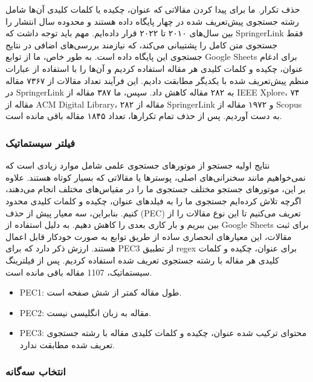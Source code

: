 \documentclass[a4paper,10pt]{article}
\begin{document}
                حذف تکرار. ما برای پیدا کردن مقالاتی که عنوان، چکیده یا کلمات کلیدی آن‌ها شامل رشته جستجوی پیش‌تعریف شده در چهار پایگاه داده هستند و محدوده سال انتشار را بین سال‌های ۲۰۱۰ تا ۲۰۲۲ قرار داده‌ایم. مهم باید توجه داشت که SpringerLink فقط جستجوی متن کامل را پشتیبانی می‌کند، که نیازمند بررسی‌های اضافی در نتایج جستجوی این پایگاه داده است. به طور خاص، ما از توابع Google Sheets برای ادغام عنوان، چکیده و کلمات کلیدی هر مقاله استفاده کردیم و آن‌ها را با استفاده از عبارات منظم پیش‌تعریف شده با یکدیگر مطابقت دادیم. این فرآیند تعداد مقالات از ۷۳۶۷ مقاله در SpringerLink به ۲۸۲ مقاله کاهش داد. سپس، ما ۳۸۷ مقاله از IEEE Xplore، ۷۴ مقاله از ACM Digital Library، ۲۸۲ مقاله از SpringerLink و ۱۹۷۲ مقاله از Scopus به دست آوردیم. پس از حذف تمام تکرارها، تعداد ۱۸۴۵ مقاله باقی مانده است.
            
            \subsubsection{فیلتر سیستماتیک}

                نتایج اولیه جستجو از موتورهای جستجوی علمی شامل موارد زیادی است که نمی‌خواهیم مانند سخنرانی‌های اصلی، پوسترها یا مقالاتی که بسیار کوتاه هستند. علاوه بر این، موتورهای جستجو مختلف جستجوی ما را در مقیاس‌های مختلف انجام می‌دهند، اگرچه تلاش کرده‌ایم جستجوی ما را به فیلدهای عنوان، چکیده و کلمات کلیدی محدود کنیم. بنابراین، سه معیار پیش از حذف (PEC) تعریف می‌کنیم تا این نوع مقالات را از بین ببریم و بار کاری بعدی را کاهش دهیم. به دلیل استفاده از Google Sheets برای ثبت مقالات، این معیارهای انحصاری ساده از طریق توابع به صورت خودکار قابل اعمال هستند. ارزش ذکر دارد که برای PEC3 از تطبیق regex برای عنوان، چکیده و کلمات کلیدی هر مقاله با رشته جستجوی تعریف شده استفاده کردیم. پس از فیلترینگ سیستماتیک، 1107 مقاله باقی مانده است.

                \begin{itemize}
                    \item PEC1: طول مقاله کمتر از شش صفحه است.
                    \item PEC2: مقاله به زبان انگلیسی نیست.
                    \item PEC3: محتوای ترکیب شده عنوان، چکیده و کلمات کلیدی مقاله با رشته جستجوی تعریف شده مطابقت ندارد.
                \end{itemize}
            
            \subsubsection{انتخاب سه‌گانه}
\end{document}
